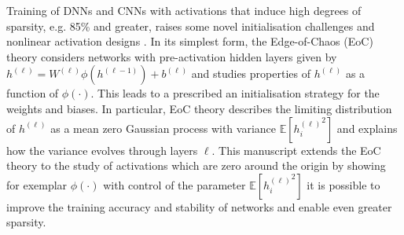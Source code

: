 \documentclass{article}
\theoremstyle{plain}
\theoremstyle{definition}
\theoremstyle{remark}
\begin{document}
Training of DNNs and CNNs with activations that induce high degrees of sparsity, e.g. 85\% and greater, raises some novel initialisation challenges and nonlinear activation designs \cite{price_deep_2023}. In its simplest form, the Edge-of-Chaos (EoC) theory considers networks with pre-activation hidden layers given by $h^{(\ell)}=W^{(\ell)} \phi(h^{(\ell -1)}) +b^{(\ell)}$ and studies properties of $h^{(\ell)}$ as a function of $\phi(\cdot)$. This leads to a prescribed an initialisation strategy for the weights and biases. In particular, EoC theory describes the limiting distribution of $h^{(\ell)}$ as a mean zero Gaussian process with variance $\mathbb{E}\left[{h^{(\ell)}_i}^2\right]$ and explains how the variance evolves through layers $\ell$. %
This manuscript extends the EoC theory to the study of activations which are zero around the origin by showing for exemplar $\phi(\cdot)$ with control of the parameter $\mathbb{E}\left[{h^{(\ell)}_i}^2\right]$ it is possible to improve the training accuracy and stability of networks and enable even greater sparsity. %

\end{document}
